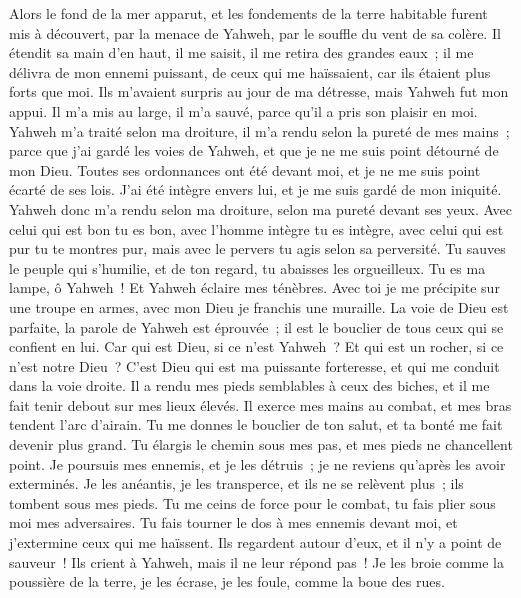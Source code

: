 \begin{multicols}{2}
Alors le fond de la mer apparut, et les fondements de la terre habitable furent mis à découvert, par la menace de Yahweh, par le souffle du vent de sa colère.
Il étendit sa main d'en haut, il me saisit, il me retira des grandes eaux~;
il me délivra de mon ennemi puissant, de ceux qui me haïssaient, car ils étaient plus forts que moi.
Ils m'avaient surpris au jour de ma détresse, mais Yahweh fut mon appui.
Il m'a mis au large, il m'a sauvé, parce qu'il a pris son plaisir en moi.
Yahweh m'a traité selon ma droiture, il m'a rendu selon la pureté de mes mains~;
parce que j'ai gardé les voies de Yahweh, et que je ne me suis point détourné de mon Dieu.
Toutes ses ordonnances ont été devant moi, et je ne me suis point écarté de ses lois.
J'ai été intègre envers lui, et je me suis gardé de mon iniquité.
Yahweh donc m'a rendu selon ma droiture, selon ma pureté devant ses yeux.
Avec celui qui est bon tu es bon, avec l'homme intègre tu es intègre,
avec celui qui est pur tu te montres pur, mais avec le pervers tu agis selon sa perversité.
Tu sauves le peuple qui s'humilie, et de ton regard, tu abaisses les orgueilleux.
Tu es ma lampe, ô Yahweh~! Et Yahweh éclaire mes ténèbres.
Avec toi je me précipite sur une troupe en armes, avec mon Dieu je franchis une muraille.
La voie de Dieu est parfaite, la parole de Yahweh est éprouvée~; il est le bouclier de tous ceux qui se confient en lui.
Car qui est Dieu, si ce n'est Yahweh~? Et qui est un rocher, si ce n'est notre Dieu~?
C'est Dieu qui est ma puissante forteresse, et qui me conduit dans la voie droite.
Il a rendu mes pieds semblables à ceux des biches, et il me fait tenir debout sur mes lieux élevés.
Il exerce mes mains au combat, et mes bras tendent l'arc d'airain.
Tu me donnes le bouclier de ton salut, et ta bonté me fait devenir plus grand.
Tu élargis le chemin sous mes pas, et mes pieds ne chancellent point.
Je poursuis mes ennemis, et je les détruis~; je ne reviens qu'après les avoir exterminés.
Je les anéantis, je les transperce, et ils ne se relèvent plus~; ils tombent sous mes pieds.
Tu me ceins de force pour le combat, tu fais plier sous moi mes adversaires.
Tu fais tourner le dos à mes ennemis devant moi, et j'extermine ceux qui me haïssent.
Ils regardent autour d'eux, et il n'y a point de sauveur~! Ils crient à Yahweh, mais il ne leur répond pas~!
Je les broie comme la poussière de la terre, je les écrase, je les foule, comme la boue des rues.

\end{multicols}
